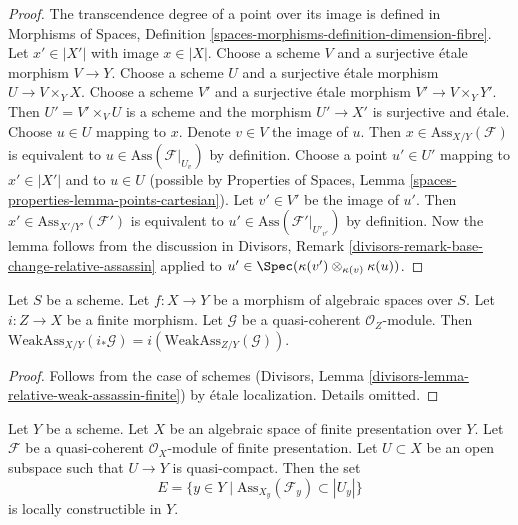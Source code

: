 \begin{proof}
The transcendence degree of a point over its image is defined in
Morphisms of Spaces, Definition
\ref{spaces-morphisms-definition-dimension-fibre}.
Let $x' \in |X'|$ with image $x \in |X|$.
Choose a scheme $V$ and a surjective \'etale morphism $V \to Y$.
Choose a scheme $U$ and a surjective
\'etale morphism $U \to V \times_Y X$. Choose a scheme $V'$
and a surjective \'etale morphism $V' \to V \times_Y Y'$.
Then $U' = V' \times_V U$ is a scheme and the morphism
$U' \to X'$ is surjective and \'etale.
Choose $u \in U$ mapping to $x$.
Denote $v \in V$ the image of $u$.
Then $x \in \text{Ass}_{X/Y}(\mathcal{F})$ is
equivalent to $u \in \text{Ass}(\mathcal{F}|_{U_v})$
by definition. Choose a point $u' \in U'$ mapping
to $x' \in |X'|$ and to $u \in U$ (possible by
Properties of Spaces, Lemma \ref{spaces-properties-lemma-points-cartesian}).
Let $v' \in V'$ be the image of $u'$.
Then $x' \in \text{Ass}_{X'/Y'}(\mathcal{F}')$ is
equivalent to $u' \in \text{Ass}(\mathcal{F}'|_{U'_{v'}})$
by definition.
Now the lemma follows from the discussion in
Divisors, Remark \ref{divisors-remark-base-change-relative-assassin}
applied to $u' \in \Spec(\kappa(v') \otimes_{\kappa(v)} \kappa(u))$.
\end{proof}

\begin{lemma}
\label{lemma-relative-weak-assassin-finite}
Let $S$ be a scheme.
Let $f : X \to Y$ be a morphism of algebraic spaces over $S$.
Let $i : Z \to X$ be a finite morphism.
Let $\mathcal{G}$ be a quasi-coherent $\mathcal{O}_Z$-module.
Then $\text{WeakAss}_{X/Y}(i_*\mathcal{G}) =
i(\text{WeakAss}_{Z/Y}(\mathcal{G}))$.
\end{lemma}

\begin{proof}
Follows from the case of schemes
(Divisors, Lemma \ref{divisors-lemma-relative-weak-assassin-finite})
by \'etale localization. Details omitted.
\end{proof}

\begin{lemma}
\label{lemma-relative-assassin-constructible}
Let $Y$ be a scheme. Let $X$ be an algebraic space of finite presentation
over $Y$. Let $\mathcal{F}$ be a quasi-coherent $\mathcal{O}_X$-module
of finite presentation. Let $U \subset X$ be an open subspace
such that $U \to Y$ is quasi-compact. Then the set
$$
E = \{y \in Y \mid \text{Ass}_{X_y}(\mathcal{F}_y) \subset |U_y|\}
$$
is locally constructible in $Y$.
\end{lemma}

